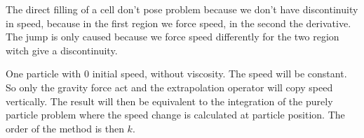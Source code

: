 The direct filling of a cell don't pose problem because we don't have discontinuity in speed, because in the first region we force speed,
in the second the derivative.
The jump is only caused because we force speed differently for the two region witch give a discontinuity.

\begin{example}
One particle with 0 initial speed, without viscosity.
The speed will be constant. So only the gravity force act and the extrapolation operator will copy speed vertically.
The result will then be equivalent to the integration of the purely particle problem where the speed change is calculated at particle position.
The order of the method is then $k$.
\end{example}

 \tikzset{external/remake next=true}
 \tikzset{external/remake next=true}
 \tikzset{external/remake next=true}
